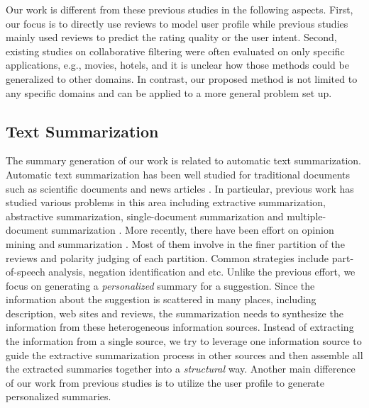 Our work is different from these previous studies in the following 
aspects. First, our focus is to directly use reviews to model user 
profile while previous studies mainly used reviews to predict the 
rating quality or the user intent. Second, existing studies on 
collaborative filtering were often evaluated on only specific applications, 
e.g., movies, hotels, and it is unclear how those methods could 
be generalized to other domains. In contrast, our proposed method 
is not limited to any specific domains and can be applied to 
a more general problem set up.  

\subsection{Text Summarization} 

The summary generation of our work is related to automatic text 
summarization. 
Automatic text summarization has been well studied for traditional 
documents such as scientific documents and news articles \cite{Radev:02}. 
In particular, previous work has studied various problems in this 
area including extractive summarization, abstractive summarization, 
single-document summarization and multiple-document summarization \cite{Das:07}. 
More recently, there have been effort on opinion mining and 
summarization \cite{Pang:2008:OMS:1454711.1454712,
Pak10, Pang:2004:SES:1218955.1218990,
mani1999advances,mani2001automatic,knight2002summarization,
ding2007utility,BACCIANELLA10.769,Chen:2010:AOM:1829879.1829923,
dey2009opinion,journals/sigir/Esuli08}. Most of them involve in the 
finer partition of the reviews and polarity judging of each partition. 
Common strategies include part-of-speech analysis, negation 
identification and etc. 
Unlike the previous effort, we focus on generating a 
{\em personalized} summary for a suggestion. 
Since the information about the suggestion is scattered in 
many places, including description, web sites 
and reviews, the summarization needs to synthesize the information 
from these heterogeneous information sources. Instead of 
extracting the information from a single source, we try to 
leverage one information source to guide the extractive 
summarization process in other sources and then assemble
all the extracted summaries together into a {\em structural} way.  
Another main difference
of our work from previous studies is to utilize the user profile 
to generate personalized summaries.  
